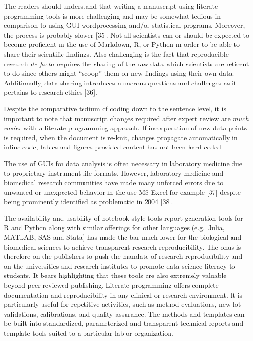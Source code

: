 \documentclass[]{elsarticle} %
\begin{document}
The readers should understand that writing a manuscript using literate
programming tools is more challenging and may be somewhat tedious in
comparison to using GUI wordprocessing and/or statistical programs.
Moreover, the process is probably slower {[}35{]}. Not all scientists
can or should be expected to become proficient in the use of Markdown,
R, or Python in order to be able to share their scientific findings.
Also challenging is the fact that reproducible research \emph{de facto}
requires the sharing of the raw data which scientists are reticent to do
since others might ``scoop'' them on new findings using their own data.
Additionally, data sharing introduces numerous questions and challenges
as it pertains to research ethics {[}36{]}.

Despite the comparative tedium of coding down to the sentence level, it
is important to note that manuscript changes required after expert
review are \emph{much easier} with a literate programming approach. If
incorporation of new data points is required, when the document is
re-knit, changes propagate automatically in inline code, tables and
figures provided content has not been hard-coded.

The use of GUIs for data analysis is often necessary in laboratory
medicine due to proprietary instrument file formats. However, laboratory
medicine and biomedical research communities have made many unforced
errors due to unwanted or unexpected behavior in the use MS Excel for
example {[}37{]} despite being prominently identified as problematic in
2004 {[}38{]}.

The availability and usability of notebook style tools report generation
tools for R and Python along with similar offerings for other languages
(e.g.~Julia, MATLAB, SAS and Stata) has made the bar much lower for the
biological and biomedical sciences to achieve transparent research
reproducibility. The onus is therefore on the publishers to push the
mandate of research reproducibility and on the universities and research
institutes to promote data science literacy to students. It bears
highlighting that these tools are also extremely valuable beyond peer
reviewed publishing. Literate programming offers complete documentation
and reproducibility in any clinical or research environment. It is
particularly useful for repetitive activities, such as method
evaluations, new lot validations, calibrations, and quality assurance.
The methods and templates can be built into standardized, parameterized
and transparent technical reports and template tools suited to a
particular lab or organization.
\end{document}
